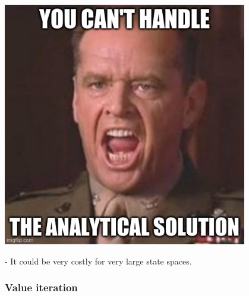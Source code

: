 \begin{frame}
{{\begin{center}
\begin{minipage}{.3\textwidth}
\begin{center}
	\includegraphics[width=0.8\textwidth]{img/meme_canthandleanalytical}
\end{center}
\end{minipage}
\end{center}
}
}

\pause 
- It could be very costly for very large state spaces.

\end{frame}


\subsubsection{Value iteration}\label{sec:findviter}

